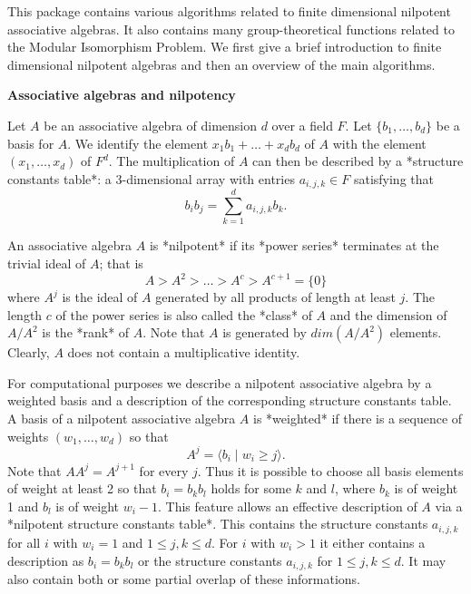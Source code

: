 

This package contains various algorithms related to finite dimensional 
nilpotent associative algebras. It also contains many group-theoretical
functions related to the Modular Isomorphism Problem.
We first give a brief introduction to finite dimensional
nilpotent algebras and then an overview of the main algorithms.
\medskip

{\bf Associative algebras and nilpotency}

Let $A$ be an associative algebra of dimension $d$ over a field $F$.
Let $\{b_1, \ldots, b_d\}$ be a basis for $A$. We identify the 
element $x_1 b_1 + \ldots + x_d b_d$ of $A$ with the element 
$(x_1, \ldots, x_d)$ of $F^d$. The multiplication of $A$ can then 
be described by a *structure constants table*: a 3-dimensional array 
with entries $a_{i,j,k} \in F$ satisfying that
$$b_i b_j = \sum_{k=1}^d a_{i,j,k} b_k.$$
\medskip

An associative algebra $A$ is *nilpotent* if its *power series* terminates
at the trivial ideal of $A$; that is
$$
A > A^2 > \ldots > A^c > A^{c+1} = \{0\} $$
where $A^j$ is the ideal of $A$ generated by all products of length 
at least $j$. The length $c$ of the power series is also called the 
*class* of $A$ and the dimension of $A/A^2$ is the *rank* of $A$. Note
that $A$ is generated by $dim(A/A^2)$ elements. Clearly, $A$ does not 
contain a multiplicative identity. 
\medskip

For computational purposes we describe a nilpotent associative algebra by 
a weighted basis and a description of the corresponding structure constants 
table. A basis of a nilpotent associative algebra $A$ is *weighted* if
there is a sequence of weights $(w_1, \ldots, w_d)$ so that
$$A^j = \langle b_i \mid w_i \geq j \rangle.$$
Note that $A A^j = A^{j+1}$ for every $j$. Thus it is possible to choose
all basis elements of weight at least 2 so that $b_i = b_k b_l$ holds for
some $k$ and $l$, where $b_k$ is of weight 1 and $b_l$ is of weight $w_i-1$. 
This feature allows an effective description of $A$ via a *nilpotent 
structure constants table*. This contains the structure constants 
$a_{i,j,k}$ for all $i$ with $w_i = 1$ and $1 \leq j,k \leq d$. For $i$ 
with $w_i > 1$ it either contains a description as $b_i = b_k b_l$ or the 
structure constants $a_{i,j,k}$ for $1 \leq j,k \leq d$. It may also 
contain both or some partial overlap of these informations.
\medskip

